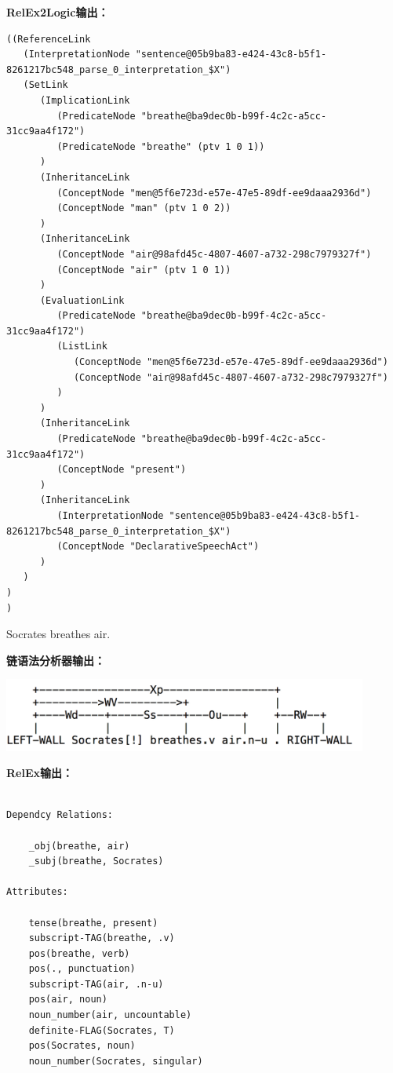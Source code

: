 {\bf RelEx2Logic输出：}

{\tt\begin{small}\begin{lstlisting}
((ReferenceLink
   (InterpretationNode "sentence@05b9ba83-e424-43c8-b5f1-8261217bc548_parse_0_interpretation_$X")
   (SetLink
      (ImplicationLink
         (PredicateNode "breathe@ba9dec0b-b99f-4c2c-a5cc-31cc9aa4f172")
         (PredicateNode "breathe" (ptv 1 0 1))
      )
      (InheritanceLink
         (ConceptNode "men@5f6e723d-e57e-47e5-89df-ee9daaa2936d")
         (ConceptNode "man" (ptv 1 0 2))
      )
      (InheritanceLink
         (ConceptNode "air@98afd45c-4807-4607-a732-298c7979327f")
         (ConceptNode "air" (ptv 1 0 1))
      )
      (EvaluationLink
         (PredicateNode "breathe@ba9dec0b-b99f-4c2c-a5cc-31cc9aa4f172")
         (ListLink
            (ConceptNode "men@5f6e723d-e57e-47e5-89df-ee9daaa2936d")
            (ConceptNode "air@98afd45c-4807-4607-a732-298c7979327f")
         )
      )
      (InheritanceLink
         (PredicateNode "breathe@ba9dec0b-b99f-4c2c-a5cc-31cc9aa4f172")
         (ConceptNode "present")
      )
      (InheritanceLink
         (InterpretationNode "sentence@05b9ba83-e424-43c8-b5f1-8261217bc548_parse_0_interpretation_$X")
         (ConceptNode "DeclarativeSpeechAct")
      )
   )
)
)
\end{lstlisting}\end{small}}

  Socrates breathes air.

{\bf 链语法分析器输出：}

\includegraphics[width=12cm]{figures/Socrates_3.png}

{\bf RelEx输出：}

\begin{verbatim}

Dependcy Relations:

    _obj(breathe, air)
    _subj(breathe, Socrates)

Attributes:

    tense(breathe, present)
    subscript-TAG(breathe, .v)
    pos(breathe, verb)
    pos(., punctuation)
    subscript-TAG(air, .n-u)
    pos(air, noun)
    noun_number(air, uncountable)
    definite-FLAG(Socrates, T)
    pos(Socrates, noun)
    noun_number(Socrates, singular)

\end{verbatim}

